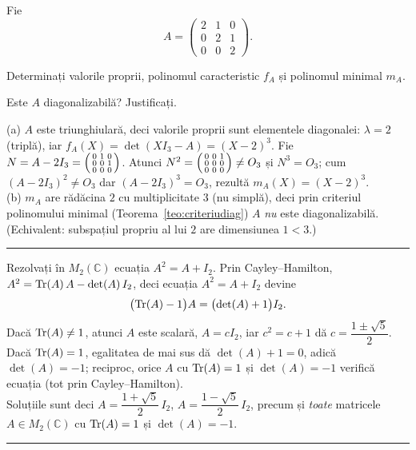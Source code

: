 Fie
\[ A=\begin{pmatrix} 2&1&0\\ 0&2&1\\ 0&0&2 \end{pmatrix}. \]
\begin{parti}
  \item Determinați valorile proprii, polinomul caracteristic $f_A$ și polinomul minimal $m_A$.
  \item Este $A$ diagonalizabilă? Justificați.
\end{parti}
\sol (a) $A$ este triunghiulară, deci valorile proprii sunt elementele diagonalei: $\lambda=2$ (triplă), iar $f_A(X)=\det(XI_3-A)=(X-2)^3$. Fie $N=A-2I_3=\begin{psmallmatrix}0&1&0\\0&0&1\\0&0&0\end{psmallmatrix}$. Atunci $N^2=\begin{psmallmatrix}0&0&1\\0&0&0\\0&0&0\end{psmallmatrix}\neq O_3$ și $N^3=O_3$; cum $(A-2I_3)^2\neq O_3$ dar $(A-2I_3)^3=O_3$, rezultă $m_A(X)=(X-2)^3$.\\[2pt]
(b) $m_A$ are rădăcina $2$ cu multiplicitate $3$ (nu simplă), deci prin criteriul polinomului minimal (Teorema~\ref{teo:criteriudiag}) $A$ \emph{nu} este diagonalizabilă. (Echivalent: subspațiul propriu al lui $2$ are dimensiunea $1<3$.)
\vspace{1mm}\hrule

Rezolvați în $M_2(\mathbb{C})$ ecuația $A^2=A+I_2$.
\sol Prin Cayley--Hamilton, $A^2=\operatorname{Tr}(A)\,A-\det(A)\,I_2$, deci ecuația $A^2=A+I_2$ devine
\[ \bigl(\operatorname{Tr}(A)-1\bigr)A=\bigl(\det(A)+1\bigr)I_2. \]
Dacă $\operatorname{Tr}(A)\neq1$, atunci $A$ este scalară, $A=cI_2$, iar $c^2=c+1$ dă $c=\dfrac{1\pm\sqrt5}{2}$. Dacă $\operatorname{Tr}(A)=1$, egalitatea de mai sus dă $\det(A)+1=0$, adică $\det(A)=-1$; reciproc, orice $A$ cu $\operatorname{Tr}(A)=1$ și $\det(A)=-1$ verifică ecuația (tot prin Cayley--Hamilton).\\[2pt]
Soluțiile sunt deci $A=\dfrac{1+\sqrt5}{2}\,I_2$, $A=\dfrac{1-\sqrt5}{2}\,I_2$, precum și \emph{toate} matricele $A\in M_2(\mathbb{C})$ cu $\operatorname{Tr}(A)=1$ și $\det(A)=-1$.
\vspace{1mm}\hrule


